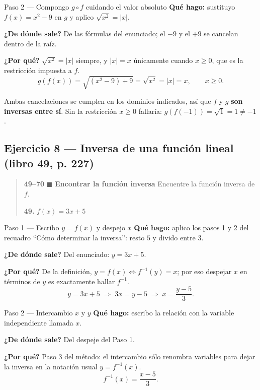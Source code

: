 \documentclass[11pt]{article}
\begin{document}
\begin{paso}{Paso 2 --- Compongo $g\circ f$ cuidando el valor absoluto}
\textbf{Qué hago:} sustituyo $f(x)=x^2-9$ en $g$ y aplico $\sqrt{x^2}=|x|$.

\textbf{¿De dónde sale?} De las fórmulas del enunciado; el $-9$ y el $+9$ se cancelan dentro de la raíz.

\textbf{¿Por qué?} $\sqrt{x^2}=|x|$ siempre, y $|x|=x$ únicamente cuando $x\ge 0$, que es la restricción impuesta a $f$.
\[
g(f(x))=\sqrt{(x^2-9)+9}=\sqrt{x^2}=|x|=x, \qquad x\ge 0.
\]
\end{paso}

\begin{resp}
Ambas cancelaciones se cumplen en los dominios indicados, así que $f$ y $g$ \textbf{son inversas entre sí}. Sin la restricción $x\ge 0$ fallaría: $g(f(-1))=\sqrt{1}=1\neq -1$.
\end{resp}

\subsection*{Ejercicio 8 --- Inversa de una función lineal (libro 49, p. 227)}

\begin{quote}
\textbf{49--70} $\blacksquare$ \textbf{Encontrar la función inversa} Encuentre la función inversa de $f$.

\textbf{49.} $f(x)=3x+5$
\end{quote}

\begin{paso}{Paso 1 --- Escribo $y=f(x)$ y despejo $x$}
\textbf{Qué hago:} aplico los pasos 1 y 2 del recuadro ``Cómo determinar la inversa'': resto $5$ y divido entre $3$.

\textbf{¿De dónde sale?} Del enunciado: $y=3x+5$.

\textbf{¿Por qué?} De la definición, $y=f(x) \iff f^{-1}(y)=x$; por eso despejar $x$ en términos de $y$ es exactamente hallar $f^{-1}$.
\[
y=3x+5 \;\Longrightarrow\; 3x=y-5 \;\Longrightarrow\; x=\frac{y-5}{3}.
\]
\end{paso}

\begin{paso}{Paso 2 --- Intercambio $x$ y $y$}
\textbf{Qué hago:} escribo la relación con la variable independiente llamada $x$.

\textbf{¿De dónde sale?} Del despeje del Paso 1.

\textbf{¿Por qué?} Paso 3 del método: el intercambio sólo renombra variables para dejar la inversa en la notación usual $y=f^{-1}(x)$.
\[
f^{-1}(x)=\frac{x-5}{3}.
\]
\end{paso}
\end{document}
